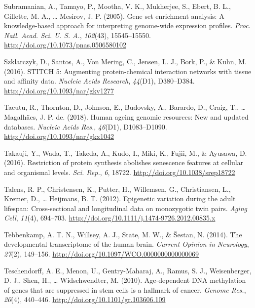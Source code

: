 \documentclass[12pt,twoside]{unicam}
\begin{document}
\begin{cslreferences}
\leavevmode\hypertarget{ref-Subramanian2005}{}%
Subramanian, A., Tamayo, P., Mootha, V. K., Mukherjee, S., Ebert, B. L., Gillette, M. A., \ldots{} Mesirov, J. P. (2005). Gene set enrichment analysis: A knowledge-based approach for interpreting genome-wide expression profiles. \emph{Proc. Natl. Acad. Sci. U. S. A.}, \emph{102}(43), 15545--15550. \url{http://doi.org/10.1073/pnas.0506580102}

\leavevmode\hypertarget{ref-Szklarczyk2016}{}%
Szklarczyk, D., Santos, A., Von Mering, C., Jensen, L. J., Bork, P., \& Kuhn, M. (2016). STITCH 5: Augmenting protein-chemical interaction networks with tissue and affinity data. \emph{Nucleic Acids Research}, \emph{44}(D1), D380--D384. \url{http://doi.org/10.1093/nar/gkv1277}

\leavevmode\hypertarget{ref-Tacutu2018}{}%
Tacutu, R., Thornton, D., Johnson, E., Budovsky, A., Barardo, D., Craig, T., \ldots{} Magalhães, J. P. de. (2018). Human ageing genomic resources: New and updated databases. \emph{Nucleic Acids Res.}, \emph{46}(D1), D1083--D1090. \url{http://doi.org/10.1093/nar/gkx1042}

\leavevmode\hypertarget{ref-Takauji2016}{}%
Takauji, Y., Wada, T., Takeda, A., Kudo, I., Miki, K., Fujii, M., \& Ayusawa, D. (2016). Restriction of protein synthesis abolishes senescence features at cellular and organismal levels. \emph{Sci. Rep.}, \emph{6}, 18722. \url{http://doi.org/10.1038/srep18722}

\leavevmode\hypertarget{ref-Talens2012}{}%
Talens, R. P., Christensen, K., Putter, H., Willemsen, G., Christiansen, L., Kremer, D., \ldots{} Heijmans, B. T. (2012). Epigenetic variation during the adult lifespan: Cross-sectional and longitudinal data on monozygotic twin pairs. \emph{Aging Cell}, \emph{11}(4), 694--703. \url{http://doi.org/10.1111/j.1474-9726.2012.00835.x}

\leavevmode\hypertarget{ref-Tebbenkamp2014}{}%
Tebbenkamp, A. T. N., Willsey, A. J., State, M. W., \& Šestan, N. (2014). The developmental transcriptome of the human brain. \emph{Current Opinion in Neurology}, \emph{27}(2), 149--156. \url{http://doi.org/10.1097/WCO.0000000000000069}

\leavevmode\hypertarget{ref-Teschendorff2010}{}%
Teschendorff, A. E., Menon, U., Gentry-Maharaj, A., Ramus, S. J., Weisenberger, D. J., Shen, H., \ldots{} Widschwendter, M. (2010). Age-dependent DNA methylation of genes that are suppressed in stem cells is a hallmark of cancer. \emph{Genome Res.}, \emph{20}(4), 440--446. \url{http://doi.org/10.1101/gr.103606.109}


\end{cslreferences}
\end{document}
